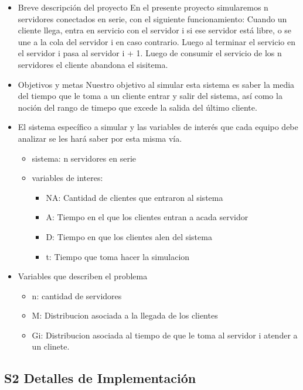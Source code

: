 \documentclass[
]{article}
\providecommand{\tightlist}{%
  \setlength{\itemsep}{0pt}\setlength{\parskip}{0pt}}
\begin{document}
\begin{itemize}
\item
  Breve descripción del proyecto En el presente proyecto simularemos n
  servidores conectados en serie, con el siguiente funcionamiento:
  Cuando un cliente llega, entra en servicio con el servidor i si ese
  servidor está libre, o se une a la cola del servidor i en caso
  contrario. Luego al terminar el servicio en el servidor i pasa al
  servidor i + 1. Luego de consumir el servicio de los n servidores el
  cliente abandona el sisitema.
\item
  Objetivos y metas Nuestro objetivo al simular esta sistema es saber la
  media del tiempo que le toma a un cliente entrar y salir del sistema,
  así como la noción del rango de timepo que excede la salida del último
  cliente.
\item
  El sistema específico a simular y las variables de interés que cada
  equipo debe analizar se les hará saber por esta misma vía.

  \begin{itemize}
  \tightlist
  \item
    sistema: n servidores en serie
  \item
    variables de interes:

    \begin{itemize}
    \tightlist
    \item
      NA: Cantidad de clientes que entraron al sistema
    \item
      A: Tiempo en el que los clientes entran a acada servidor
    \item
      D: Tiempo en que los clientes alen del sistema
    \item
      t: Tiempo que toma hacer la simulacion
    \end{itemize}
  \end{itemize}
\item
  Variables que describen el problema

  \begin{itemize}
  \tightlist
  \item
    n: cantidad de servidores
  \item
    M: Distribucion asociada a la llegada de los clientes
  \item
    Gi: Distribucion asociada al tiempo de que le toma al servidor i
    atender a un clinete.
  \end{itemize}
\end{itemize}

\hypertarget{s2-detalles-de-implementaciuxf3n}{%
\subsection{S2 Detalles de
Implementación}\label{s2-detalles-de-implementaciuxf3n}}
\end{document}

